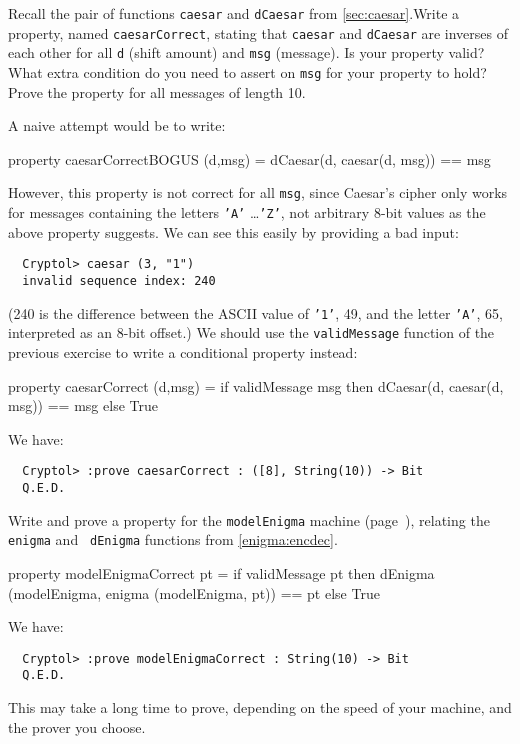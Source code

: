 \begin{Exercise}\label{ex:cond:3}
  Recall the pair of functions {\tt caesar} and {\tt dCaesar} from
  \autoref{sec:caesar}.\indCaesarscipher Write a property, named
  {\tt caesarCorrect}, stating that {\tt caesar} and {\tt dCaesar} are
  inverses of each other for all {\tt d} (shift amount) and {\tt msg}
  (message). Is your property valid? What extra condition do you
  need to assert on {\tt msg} for your property to hold? Prove the
  property for all messages of length 10.
\end{Exercise}
\begin{Answer}
  A naive attempt would be to write:
\begin{code}
  property caesarCorrectBOGUS (d,msg) =
           dCaesar(d, caesar(d, msg)) == msg
\end{code}
However, this property is not correct for all \texttt{msg}, since
Caesar's cipher only works for messages containing the letters
\texttt{'A'} \ldots \texttt{'Z'}, not arbitrary 8-bit values as the
above property suggests. We can see this easily by providing a bad
input:
\begin{Verbatim}
  Cryptol> caesar (3, "1")
  invalid sequence index: 240
\end{Verbatim}
(240 is the difference between the ASCII value of {\tt '1'}, 49, and
the letter {\tt 'A'}, 65, interpreted as an 8-bit offset.) We should
use the {\tt validMessage} function of the previous exercise to write
a conditional property instead:
\begin{code}
  property caesarCorrect (d,msg) = if validMessage msg
                                   then dCaesar(d, caesar(d, msg)) == msg
                                   else True
\end{code}
We have:
\begin{Verbatim}
  Cryptol> :prove caesarCorrect : ([8], String(10)) -> Bit
  Q.E.D.
\end{Verbatim}
\end{Answer}

\begin{Exercise}\label{ex:cond:4}
  Write and prove a property for the {\tt modelEnigma} machine
  (page~\pageref{def:modelEnigma}), relating the {\tt enigma} and {\tt
    dEnigma} functions from \autoref{enigma:encdec}.
\end{Exercise}
\begin{Answer}
\begin{code}
  property modelEnigmaCorrect pt =
       if validMessage pt
       then dEnigma (modelEnigma, enigma (modelEnigma, pt)) == pt
       else True
\end{code}
We have:
\begin{Verbatim}
  Cryptol> :prove modelEnigmaCorrect : String(10) -> Bit
  Q.E.D.
\end{Verbatim}
\end{Answer}
This may take a long time to prove, depending on the speed of your
machine, and the prover you choose.

